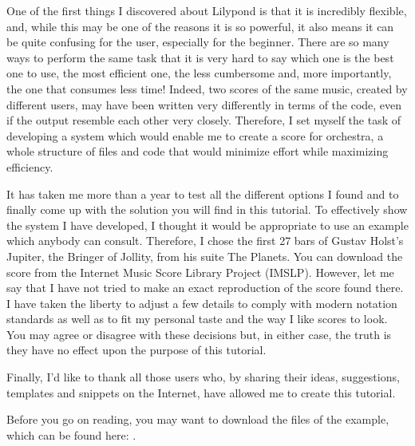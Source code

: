 \documentclass[../../LilyPond-Tutorials]{subfiles}
\begin{document}
One of the first things I discovered about Lilypond is that it is incredibly flexible, and, while this may be one of the reasons it is so powerful, it also means it can be quite confusing for the user, especially for the beginner.
There are so many ways to perform the same task that it is very hard to say which one is the best one to use, the most efficient one, the less cumbersome and, more importantly, the one that consumes less time!
Indeed, two scores of the same music, created by different users, may have been written very differently in terms of the code, even if the output resemble each other very closely.
Therefore, I set myself the task of developing a system which would enable me to create a score for orchestra, a whole structure of files and code that would minimize effort while maximizing efficiency.

It has taken me more than a year to test all the different options I found and to finally come up with the solution you will find in this tutorial.
To effectively show the system I have developed, I thought it would be appropriate to use an example which anybody can consult.
Therefore, I chose the first 27 bars of Gustav Holst's Jupiter, the Bringer of Jollity, from his suite The Planets.
You can download the score from the Internet Music Score Library Project (IMSLP).
However, let me say that I have not tried to make an exact reproduction of the score found there.
I have taken the liberty to adjust a few details to comply with modern notation standards as well as to fit my personal taste and the way I like scores to look.
You may agree or disagree with these decisions but, in either case, the truth is they have no effect upon the purpose of this tutorial.

Finally, I'd like to thank all those users who, by sharing their ideas, suggestions, templates and snippets on the Internet, have allowed me to create this tutorial.

Before you go on reading, you may want to download the files of the example, which can be found here: .


\end{document}
